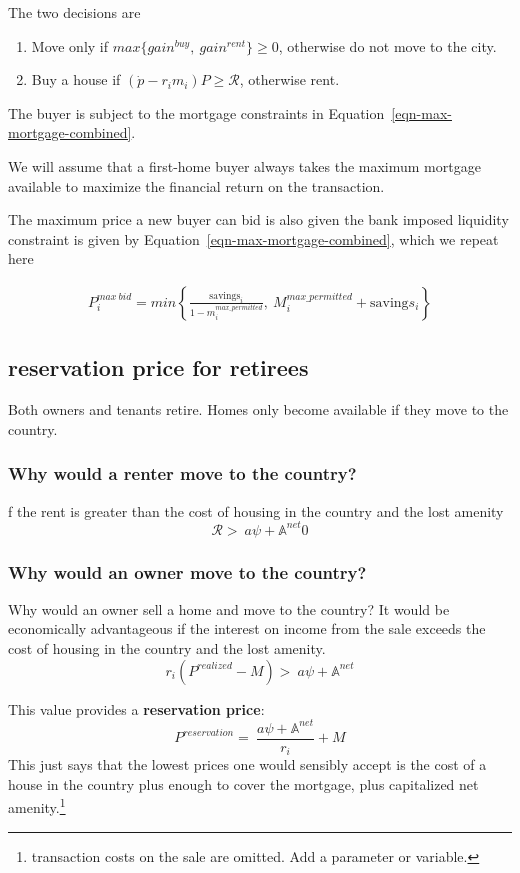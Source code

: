 The two decisions  are 
\begin{enumerate}
    \item Move only if $max\{gain^{buy},\ gain^{rent}\} \ge 0$, otherwise do not move to the city.
    
    \item Buy a house if $(\dot p-r_im_i)P\ge  \mathcal{R}$, otherwise rent.
\end{enumerate}

The buyer is subject to the mortgage constraints in Equation~\ref{eqn-max-mortgage-combined}.

We will assume that a first-home buyer always takes the maximum mortgage available to maximize the financial return on the transaction. 

The maximum price a new buyer can bid is also given the bank imposed liquidity constraint is given by Equation~\ref{eqn-max-mortgage-combined}, which we repeat here


\begin{align}
P_i^{max\ bid}= min \left\{\frac{\mathrm{savings}_i}{1-m_i^{max\_permitted}},\  M_i^{max\_permitted} + \mathrm{saving}s_i  \right\}   \nonumber  
\end{align}


\subsection{reservation price for retirees}
Both owners and tenants retire. Homes only become available if they move to the country. 



\subsubsection{Why would a renter move to the country?} 
f the rent is greater than the cost of housing in the country and the lost amenity
\[\mathcal{R} > \ a\psi+ \mathbb{A}^{net}0\]


\subsubsection{Why would an owner move to the country?}
Why would an owner sell a home and move to the country? It would be economically advantageous if the interest on income from the sale exceeds the cost of housing in the country and the lost amenity.
\[r_i(P^{realized}-M) >\ a\psi+ \mathbb{A}^{net}\label{eq:movers-gainA}\]


This value provides a \textbf{reservation price}: 
\[P^{reservation} =\ \frac{a\psi+ \mathbb{A}^{net}}{r_i}+M \label{eq:movers-gainB}\]
This just says that the lowest prices one would sensibly accept is the cost of a house in the country plus enough to cover the mortgage, plus capitalized net amenity.\footnote{transaction costs on the sale are omitted. Add a parameter or variable.}


